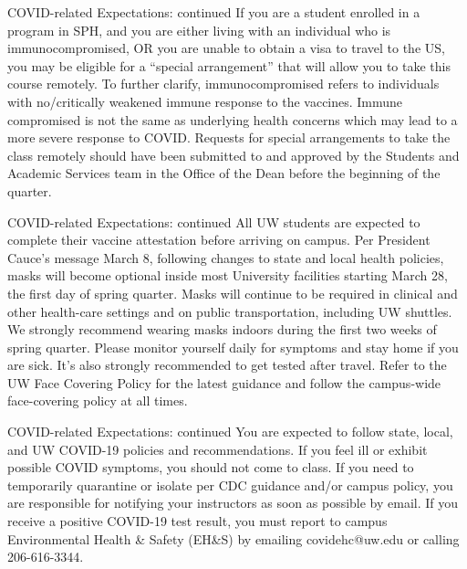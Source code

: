 \documentclass[10pt,t]{beamer}
\begin{document}
\begin{frame}{COVID-related Expectations: continued}
If you are a student enrolled in a program in SPH, and you are either living with an individual who is immunocompromised, OR you are unable to obtain a visa to travel to the US, you may be eligible for a “special arrangement” that will allow you to take this course remotely. To further clarify, immunocompromised refers to individuals with no/critically weakened immune response to the vaccines. Immune compromised is not the same as underlying health concerns which may lead to a more severe response to COVID. Requests for special arrangements to take the class remotely should have been submitted to and approved by the Students and Academic Services team in the Office of the Dean before the beginning of the quarter.
\end{frame}

\begin{frame}{COVID-related Expectations: continued}
All UW students are expected to complete their vaccine attestation before arriving on campus. Per President Cauce’s message March 8,  following changes to state and local health policies, masks will become optional inside most University facilities starting March 28, the first day of spring quarter. Masks will continue to be required in clinical and other health-care settings and on public transportation, including UW shuttles. We strongly recommend wearing masks indoors during the first two weeks of spring quarter. Please monitor yourself daily for symptoms and stay home if you are sick. It’s also strongly recommended to get tested after travel. Refer to the UW Face Covering Policy for the latest guidance and follow the campus-wide face-covering policy at all times. 
\end{frame}

\begin{frame}{COVID-related Expectations: continued}
You are expected to follow state, local, and UW COVID-19 policies and recommendations. If you feel ill or exhibit possible COVID symptoms, you should not come to class. If you need to temporarily quarantine or isolate per CDC guidance and/or campus policy, you are responsible for notifying your instructors as soon as possible by email. If you receive a positive COVID-19 test result, you must report to campus Environmental Health \& Safety (EH\&S) by emailing covidehc@uw.edu or calling 206-616-3344. 
\end{frame}
\end{document}
